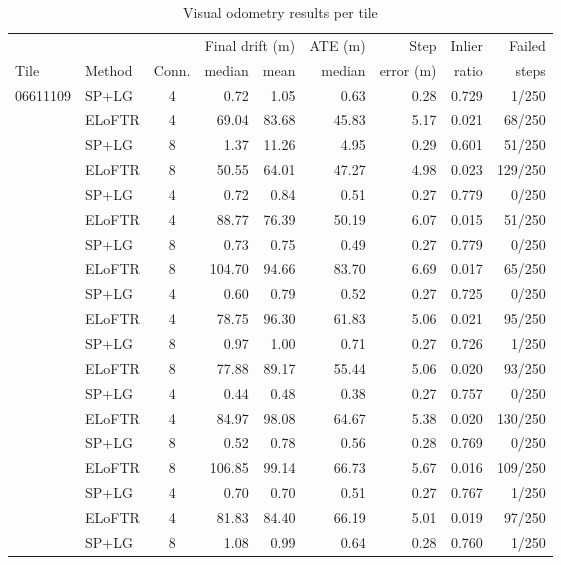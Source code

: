 \documentclass[english, Lau, oneside]{sapthesis}%
\begin{document}
\begin{table}[!htbp]
  \centering
  \caption{Visual odometry results per tile}
  \label{tab:vo-per-tile}
  \small
  \setlength{\tabcolsep}{4pt}
  \begin{tabular}{llcrrrrrr}
    \toprule
     & & & \multicolumn{2}{c}{Final drift (m)} & ATE (m) & Step & Inlier & Failed \\
    \cmidrule(lr){4-5}
    Tile & Method & Conn. & median & mean & median & error (m) & ratio & steps \\
    \midrule
    06611109 & SP+LG & 4 & 0.72 & 1.05 & 0.63 & 0.28 & 0.729 & 1/250 \\
     & ELoFTR & 4 & 69.04 & 83.68 & 45.83 & 5.17 & 0.021 & 68/250 \\
     & SP+LG & 8 & 1.37 & 11.26 & 4.95 & 0.29 & 0.601 & 51/250 \\
     & ELoFTR & 8 & 50.55 & 64.01 & 47.27 & 4.98 & 0.023 & 129/250 \\
    \addlinespace
    06611110 & SP+LG & 4 & 0.72 & 0.84 & 0.51 & 0.27 & 0.779 & 0/250 \\
     & ELoFTR & 4 & 88.77 & 76.39 & 50.19 & 6.07 & 0.015 & 51/250 \\
     & SP+LG & 8 & 0.73 & 0.75 & 0.49 & 0.27 & 0.779 & 0/250 \\
     & ELoFTR & 8 & 104.70 & 94.66 & 83.70 & 6.69 & 0.017 & 65/250 \\
    \addlinespace
    06611112 & SP+LG & 4 & 0.60 & 0.79 & 0.52 & 0.27 & 0.725 & 0/250 \\
     & ELoFTR & 4 & 78.75 & 96.30 & 61.83 & 5.06 & 0.021 & 95/250 \\
     & SP+LG & 8 & 0.97 & 1.00 & 0.71 & 0.27 & 0.726 & 1/250 \\
     & ELoFTR & 8 & 77.88 & 89.17 & 55.44 & 5.06 & 0.020 & 93/250 \\
    \addlinespace
    06611113 & SP+LG & 4 & 0.44 & 0.48 & 0.38 & 0.27 & 0.757 & 0/250 \\
     & ELoFTR & 4 & 84.97 & 98.08 & 64.67 & 5.38 & 0.020 & 130/250 \\
     & SP+LG & 8 & 0.52 & 0.78 & 0.56 & 0.28 & 0.769 & 0/250 \\
     & ELoFTR & 8 & 106.85 & 99.14 & 66.73 & 5.67 & 0.016 & 109/250 \\
    \addlinespace
    06611114 & SP+LG & 4 & 0.70 & 0.70 & 0.51 & 0.27 & 0.767 & 1/250 \\
     & ELoFTR & 4 & 81.83 & 84.40 & 66.19 & 5.01 & 0.019 & 97/250 \\
     & SP+LG & 8 & 1.08 & 0.99 & 0.64 & 0.28 & 0.760 & 1/250 \\

\end{tabular}
\end{table}
\end{document}
